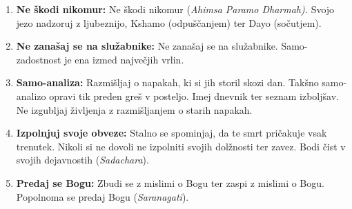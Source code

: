 \begin{enumerate}
    \item \textbf{Ne škodi nikomur:} Ne škodi nikomur (\emph{Ahimsa Paramo Dharmah).} Svojo jezo nadzoruj z ljubeznijo, Kshamo (odpuščanjem) ter Dayo (sočutjem).
    
    \item \textbf{Ne zanašaj se na služabnike:} Ne zanašaj se na služabnike. Samo-zadostnost je ena izmed največjih vrlin.
    
    \item \textbf{Samo-analiza:} Razmišljaj o napakah, ki si jih storil skozi dan. Takšno samo-analizo opravi tik preden greš v posteljo. Imej dnevnik ter seznam izboljšav. Ne izgubljaj življenja z razmišljanjem o starih napakah.
    
    \item \textbf{Izpolnjuj svoje obveze:} Stalno se spominjaj, da te smrt pričakuje vsak trenutek. Nikoli si ne dovoli ne izpolniti svojih dolžnosti ter zavez. Bodi čist v svojih dejavnostih (\emph{Sadachara}).
    
    \item \textbf{Predaj se Bogu:} Zbudi se z mislimi o Bogu ter zaspi z mislimi o Bogu. Popolnoma se predaj Bogu (\emph{Saranagati}).
    
    
    
\end{enumerate}
